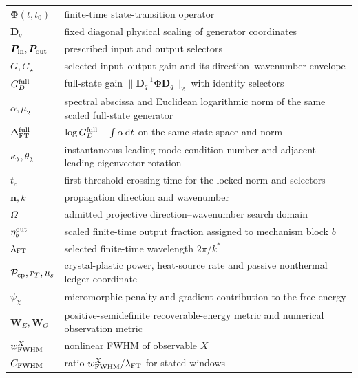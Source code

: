 \begin{longtable}{@{}p{}p{}@{}}
$\boldsymbol\Phi(t,t_0)$ & finite-time state-transition operator \\
$\boldsymbol D_q$ & fixed diagonal physical scaling of generator coordinates \\
$\boldsymbol P_{\rm in},\boldsymbol P_{\rm out}$ & prescribed input and output selectors \\
$G,G_\star$ & selected input--output gain and its direction--wavenumber envelope \\
$G_D^{\rm full}$ & full-state gain $\|\boldsymbol D_q^{-1}\boldsymbol\Phi\boldsymbol D_q\|_2$ with identity selectors \\
$\alpha,\mu_2$ & spectral abscissa and Euclidean logarithmic norm of the same scaled full-state generator \\
$\Delta_{\rm FT}^{\rm full}$ & $\log G_D^{\rm full}-\int\alpha\,\mathrm dt$ on the same state space and norm \\
$\kappa_\lambda,\theta_\lambda$ & instantaneous leading-mode condition number and adjacent leading-eigenvector rotation \\
$t_c$ & first threshold-crossing time for the locked norm and selectors \\
$\boldsymbol n,k$ & propagation direction and wavenumber \\
$\Omega$ & admitted projective direction--wavenumber search domain \\
$\eta_b^{\rm out}$ & scaled finite-time output fraction assigned to mechanism block $b$ \\
$\lambda_{\rm FT}$ & selected finite-time wavelength $2\pi/k^*$ \\
$\mathcal P_{\rm cp},r_T,u_s$ & crystal-plastic power, heat-source rate and passive nonthermal ledger coordinate \\
$\psi_\chi$ & micromorphic penalty and gradient contribution to the free energy \\
$\boldsymbol W_E,\boldsymbol W_O$ & positive-semidefinite recoverable-energy metric and numerical observation metric \\
$w_{\rm FWHM}^{X}$ & nonlinear FWHM of observable $X$ \\
$C_{\rm FWHM}$ & ratio $w_{\rm FWHM}^{X}/\lambda_{\rm FT}$ for stated windows \\
\bottomrule
\end{longtable}
